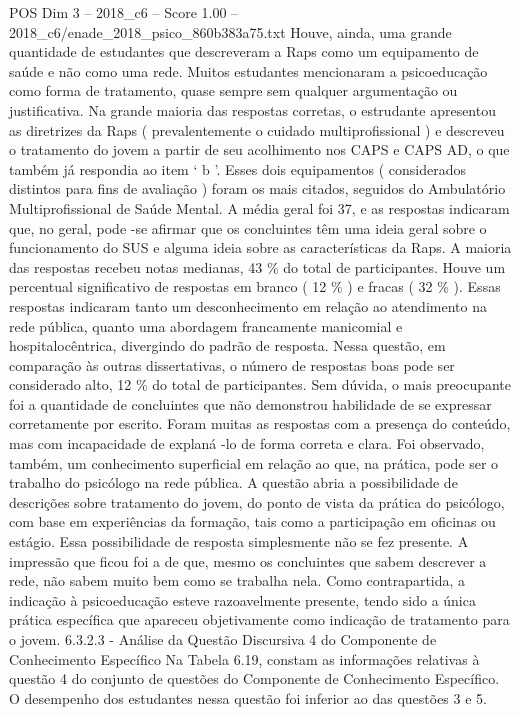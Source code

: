 \begin{textsample}{POS Dim 3 – 2018\_c6 – Score 1.00 – 2018\_c6/enade\_2018\_psico\_860b383a75.txt}
Houve, ainda, uma grande quantidade de estudantes que descreveram a Raps como um equipamento de saúde e não como uma rede.
Muitos estudantes mencionaram a psicoeducação como forma de tratamento, quase sempre sem qualquer argumentação ou justificativa.
Na grande maioria das respostas corretas, o estrudante apresentou as diretrizes da Raps ( prevalentemente o cuidado multiprofissional ) e descreveu o tratamento do jovem a partir de seu acolhimento nos CAPS e CAPS AD, o que também já respondia ao item ‘ b ’.
Esses dois equipamentos ( considerados distintos para fins de avaliação ) foram os mais citados, seguidos do Ambulatório Multiprofissional de Saúde Mental.
A média geral foi 37, e as respostas indicaram que, no geral, pode -se afirmar que os concluintes têm uma ideia geral sobre o funcionamento do SUS e alguma ideia sobre as características da Raps.
A maioria das respostas recebeu notas medianas, 43 \% do total de participantes.
Houve um percentual significativo de respostas em branco ( 12 \% ) e fracas ( 32 \% ).
Essas respostas indicaram tanto um desconhecimento em relação ao atendimento na rede pública, quanto uma abordagem francamente manicomial e hospitalocêntrica, divergindo do padrão de resposta.
Nessa questão, em comparação às outras dissertativas, o número de respostas boas pode ser considerado alto, 12 \% do total de participantes.
Sem dúvida, o mais preocupante foi a quantidade de concluintes que não demonstrou habilidade de se expressar corretamente por escrito.
Foram muitas as respostas com a presença do conteúdo, mas com incapacidade de explaná -lo de forma correta e clara.
Foi observado, também, um conhecimento superficial em relação ao que, na prática, pode ser o trabalho do psicólogo na rede pública.
A questão abria a possibilidade de descrições sobre tratamento do jovem, do ponto de vista da prática do psicólogo, com base em experiências da formação, tais como a participação em oficinas ou estágio.
Essa possibilidade de resposta simplesmente não se fez presente.
A impressão que ficou foi a de que, mesmo os concluintes que sabem descrever a rede, não sabem muito bem como se trabalha nela.
Como contrapartida, a indicação à psicoeducação esteve razoavelmente presente, tendo sido a única prática específica que apareceu objetivamente como indicação de tratamento para o jovem. 6.3.2.3 - Análise da Questão Discursiva 4 do Componente de Conhecimento Específico Na Tabela 6.19, constam as informações relativas à questão 4 do conjunto de questões do Componente de Conhecimento Específico.
O desempenho dos estudantes nessa questão foi inferior ao das questões 3 e 5.

\end{textsample}
